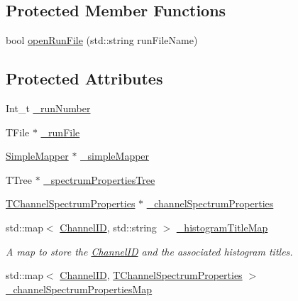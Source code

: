 \subsection*{Protected Member Functions}
\begin{DoxyCompactItemize}
\item 
bool \hyperlink{class_spectrum_properties_run_info_a8253f12715497ad525f27104c8ce4a85}{openRunFile} (std::string runFileName)
\end{DoxyCompactItemize}
\subsection*{Protected Attributes}
\begin{DoxyCompactItemize}
\item 
Int\_\-t \hyperlink{class_spectrum_properties_run_info_af3b62d094196da758718fbc1d05eed96}{\_\-runNumber}
\item 
TFile $\ast$ \hyperlink{class_spectrum_properties_run_info_aab03a803b16b50f0d444f031b41ffebc}{\_\-runFile}
\item 
\hyperlink{class_simple_mapper}{SimpleMapper} $\ast$ \hyperlink{class_spectrum_properties_run_info_a1a2747ac99761940eb128ca041014dc2}{\_\-simpleMapper}
\item 
TTree $\ast$ \hyperlink{class_spectrum_properties_run_info_ae3cb4e7dd3f4d8fc02094738ba60cfca}{\_\-spectrumPropertiesTree}
\item 
\hyperlink{class_t_channel_spectrum_properties}{TChannelSpectrumProperties} $\ast$ \hyperlink{class_spectrum_properties_run_info_a905d33381539ab3737b6c55261e0fc1f}{\_\-channelSpectrumProperties}
\item 
std::map$<$ \hyperlink{class_spectrum_properties_run_info_1_1_channel_i_d}{ChannelID}, std::string $>$ \hyperlink{class_spectrum_properties_run_info_a9e75eca5cf3a61ec892a62862d159111}{\_\-histogramTitleMap}
\begin{DoxyCompactList}\small\item\em A map to store the \hyperlink{class_spectrum_properties_run_info_1_1_channel_i_d}{ChannelID} and the associated histogram titles. \item\end{DoxyCompactList}\item 
std::map$<$ \hyperlink{class_spectrum_properties_run_info_1_1_channel_i_d}{ChannelID}, \hyperlink{class_t_channel_spectrum_properties}{TChannelSpectrumProperties} $>$ \hyperlink{class_spectrum_properties_run_info_a673b97ff771527ce85493856e80e7b83}{\_\-channelSpectrumPropertiesMap}

\end{DoxyCompactItemize}
